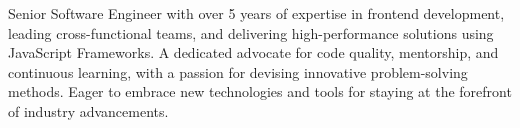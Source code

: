 

\begin{cvparagraph}

Senior Software Engineer with over 5 years of expertise in frontend development, leading cross-functional teams, and delivering high-performance solutions using JavaScript Frameworks. A dedicated advocate for code quality, mentorship, and continuous learning, with a passion for devising innovative problem-solving methods. Eager to embrace new technologies and tools for staying at the forefront of industry advancements.

\end{cvparagraph}
